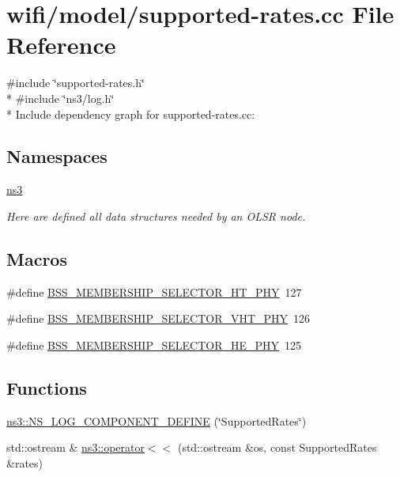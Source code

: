 \hypertarget{supported-rates_8cc}{}\section{wifi/model/supported-\/rates.cc File Reference}
\label{supported-rates_8cc}
{\ttfamily \#include \char`\"{}supported-\/rates.\+h\char`\"{}}\\*
{\ttfamily \#include \char`\"{}ns3/log.\+h\char`\"{}}\\*
Include dependency graph for supported-\/rates.cc\+:
\subsection*{Namespaces}
\begin{DoxyCompactItemize}
\item 
 \hyperlink{namespacens3}{ns3}
\begin{DoxyCompactList}\small\item\em Here are defined all data structures needed by an O\+L\+SR node. \end{DoxyCompactList}\end{DoxyCompactItemize}
\subsection*{Macros}
\begin{DoxyCompactItemize}
\item 
\#define \hyperlink{supported-rates_8cc_a08a3756893bcc2106eaa3e4c2c8b85a9}{B\+S\+S\+\_\+\+M\+E\+M\+B\+E\+R\+S\+H\+I\+P\+\_\+\+S\+E\+L\+E\+C\+T\+O\+R\+\_\+\+H\+T\+\_\+\+P\+HY}~127
\item 
\#define \hyperlink{supported-rates_8cc_acb3ac24cdcc68c1a711dee3fcca1227d}{B\+S\+S\+\_\+\+M\+E\+M\+B\+E\+R\+S\+H\+I\+P\+\_\+\+S\+E\+L\+E\+C\+T\+O\+R\+\_\+\+V\+H\+T\+\_\+\+P\+HY}~126
\item 
\#define \hyperlink{supported-rates_8cc_a76abd34ec3750141a3a21e1add951999}{B\+S\+S\+\_\+\+M\+E\+M\+B\+E\+R\+S\+H\+I\+P\+\_\+\+S\+E\+L\+E\+C\+T\+O\+R\+\_\+\+H\+E\+\_\+\+P\+HY}~125
\end{DoxyCompactItemize}
\subsection*{Functions}
\begin{DoxyCompactItemize}
\item 
\hyperlink{namespacens3_afe4bbab039d12f87f3b179beb020f839}{ns3\+::\+N\+S\+\_\+\+L\+O\+G\+\_\+\+C\+O\+M\+P\+O\+N\+E\+N\+T\+\_\+\+D\+E\+F\+I\+NE} (\char`\"{}Supported\+Rates\char`\"{})
\item 
std\+::ostream \& \hyperlink{namespacens3_a0017789c3fd3a17879db574f36fa4e80}{ns3\+::operator$<$$<$} (std\+::ostream \&os, const Supported\+Rates \&rates)
\end{DoxyCompactItemize}


